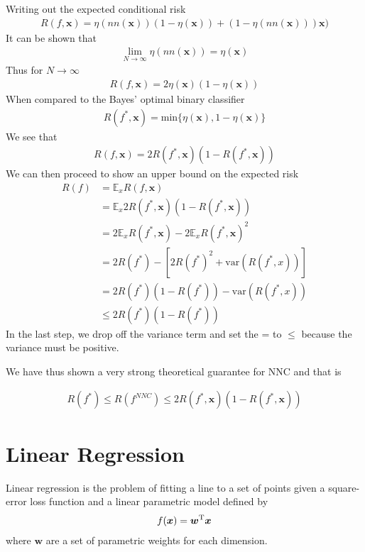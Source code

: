 \documentclass[11pt]{article}
\newcommand{\vct}[1]{\boldsymbol{#1}} %
\newcommand{\T}{^{\textrm T}} %
\newcommand{\ProbOpr}[1]{\mathbb{#1}}
\begin{document}
Writing out the expected conditional risk
\begin{align*}
R(f,\vct{x}) = \eta(nn(\vct{x}))(1- \eta(\vct{x})) +  (1- \eta(nn(\vct{x})))\vct{x})
\end{align*}
It can be shown that
\begin{align*}
\lim_{N \to \infty} \eta(nn(\vct{x})) = \eta(\vct{x})
\end{align*}
Thus for $N \to \infty$
\begin{align*}
R(f,\vct{x}) = 2\eta(\vct{x})(1-\eta(\vct{x}))
\end{align*}
When compared to the Bayes' optimal binary classifier
\begin{align*}
R(f^*,\vct{x}) = \text{min}\{\eta(\vct{x}), 1-\eta(\vct{x}) \}
\end{align*}
We see that 
\begin{align*}
R(f,\vct{x}) = 2R(f^*,\vct{x}) (1 - R(f^*,\vct{x}) )
\end{align*}
We can then proceed to show an upper bound on the expected risk
\begin{align*}
R(f) &= \ProbOpr{E}_{x}R(f,\vct{x})\\
&=  \ProbOpr{E}_{x}2R(f^*,\vct{x})(1- R(f^*,\vct{x}))\\
&=  2\ProbOpr{E}_{x}R(f^*,\vct{x}) - 2\ProbOpr{E}_{x}R(f^*,\vct{x})^2\\
&=  2R(f^*) - [2R(f^*)^2 + \text{var}(R(f^*,x))]\\
&=  2R(f^*)(1 - R(f^*)) - \text{var}(R(f^*,x))\\
&\le  2R(f^*)(1 - R(f^*))
\end{align*}
In the last step, we drop off the variance term and set the = to $\le$ because the variance must be positive.

We have thus shown a very strong theoretical guarantee for NNC and that is

\begin{align*}
R(f^*) \le R(f^{NNC}) \le 2R(f^*,\vct{x}) (1 - R(f^*,\vct{x}) )
\end{align*}

\section{Linear Regression}
Linear regression is the problem of fitting a line to a set of points given a square-error loss function and a linear parametric model defined by
\begin{align*}
f(\vct{x}) = \vct{w}\T\vct{x}
\end{align*}
where $\vct{w}$ are a set of parametric weights for each dimension.
\end{document}
